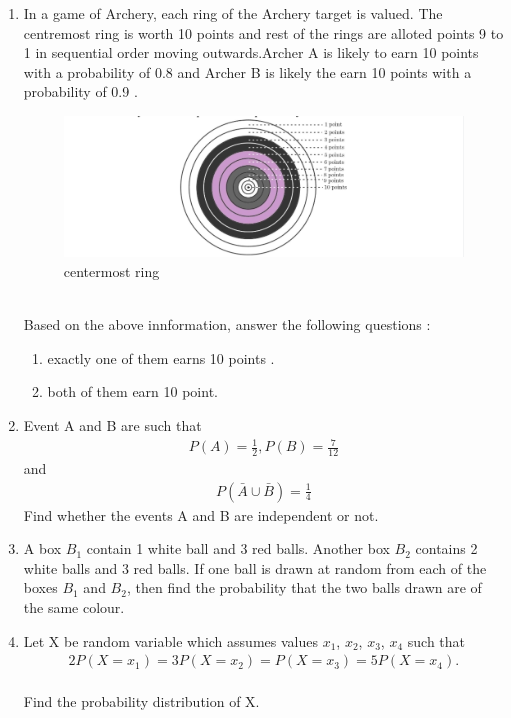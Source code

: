 \begin{enumerate}[label=\thesection.\arabic*.,ref=\thesection.\theenumi]
\item In a game of Archery, each ring of the Archery target is valued. The centremost ring is worth 10 points and rest of the rings are alloted points 9 to 1 in sequential order moving outwards.Archer A is likely to earn 10 points with a probability of 0.8 and Archer B is likely the earn 10 points with a probability of 0.9 .
\begin{figure}[!ht]                     
\centering
\includegraphics[width=\columnwidth]{figs/archery}
\caption{centermost ring}                   
\label{fig:2022/probability/archery3}                        
\end{figure}
\\ Based on the above innformation, answer the following questions :
\begin{enumerate}
\item exactly one of them earns 10 points .
\item both of them earn 10 point.
\end{enumerate}
\item Event A and B are such that \begin{align} P(A) = \frac{1}{2},  P(B) = \frac{7}{12}\end{align} and \begin{align} P(\bar{A}\cup \bar{B}) = \frac{1}{4} \end{align}
Find whether the events  A and B are independent or not.
\item A box $B_1$ contain 1 white ball  and 3 red balls. Another box $B_2$ contains 2 white balls and 3 red balls. If one ball is drawn at random from each of the boxes $B_1$ and $B_2$, then find the probability that the two balls drawn are of the same colour.
\item Let X be random variable which assumes values $x_1$, $x_2$, $x_3$, $x_4$  such that\begin{align} 2P(X = x_1) = 3P (X = x_2) = P ( X = x_3) = 5P (X = x_4).\end{align}
\\ Find the probability distribution of X.

\end{enumerate}
